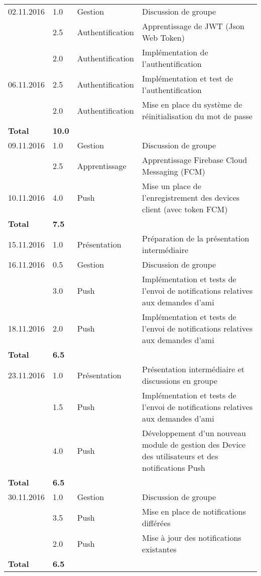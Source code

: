 \documentclass[french]{article}
\begin{document}
\begin{longtable}{p{}|p{}|p{}|p{}}
		\hline
		02.11.2016 & 1.0 & Gestion & Discussion de groupe \\
			       & 2.5 & Authentification & Apprentissage de JWT (Json Web Token) \\
  			       & 2.0 & Authentification & Implémentation de l'authentification \\
		06.11.2016 & 2.5 & Authentification & Implémentation et test de l'authentification \\
				   & 2.0 & Authentification & Mise en place du système de réinitialisation du mot de passe \\
		\textbf{Total} & \textbf{10.0} && \\
		
		\hline
		09.11.2016 & 1.0 & Gestion & Discussion de groupe \\
		           & 2.5 & Apprentissage & Apprentissage Firebase Cloud Messaging (FCM) \\
		10.11.2016 & 4.0 & Push & Mise un place de l'enregistrement des devices client (avec token FCM) \\
		\textbf{Total} & \textbf{7.5} && \\
		
		\hline
		15.11.2016 & 1.0 & Présentation & Préparation de la présentation intermédiaire \\
		16.11.2016 & 0.5 & Gestion & Discussion de groupe \\
				   & 3.0 & Push & Implémentation et tests de l'envoi de notifications relatives aux demandes d'ami \\
		18.11.2016 & 2.0 & Push & Implémentation et tests de l'envoi de notifications relatives aux demandes d'ami \\
		\textbf{Total} & \textbf{6.5} && \\
		
		\hline
		23.11.2016 & 1.0 & Présentation & Présentation intermédiaire et discussions en groupe \\
		           & 1.5 & Push & Implémentation et tests de l'envoi de notifications relatives aux demandes d'ami \\
		           & 4.0 & Push & Développement d'un nouveau module de gestion des Device des utilisateurs et des notifications Push \\
		\textbf{Total} & \textbf{6.5} && \\

		\hline
		30.11.2016 & 1.0 & Gestion & Discussion de groupe \\
				   & 3.5 & Push & Mise en place de notifications différées  \\
				   & 2.0 & Push & Mise à jour des notifications existantes \\
		\textbf{Total} & \textbf{6.5} && \\
	

\end{longtable}
\end{document}
